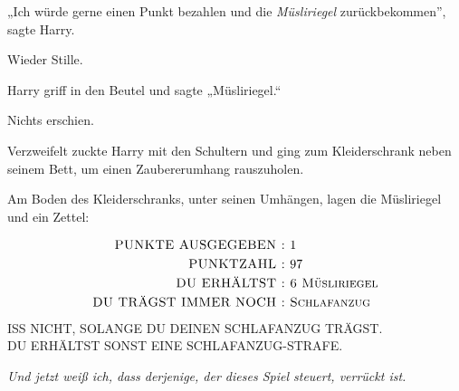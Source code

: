 „Ich würde gerne einen Punkt bezahlen und die \emph{Müsliriegel} zurückbekommen”, sagte Harry.

Wieder Stille.

Harry griff in den Beutel und sagte „Müsliriegel.“

Nichts erschien.

Verzweifelt zuckte Harry mit den Schultern und ging zum Kleiderschrank neben seinem Bett, um einen Zaubererumhang rauszuholen.

Am Boden des Kleiderschranks, unter seinen Umhängen, lagen die Müsliriegel und ein Zettel:
\begin{writtenNote}\centering
\begin{align*}
\hbox{\scshape \uppercase{Punkte ausgegeben}~: }&\hbox{1}\\
\hbox{\scshape \uppercase{Punktzahl}~: }&\hbox{97}\\
\hbox{\scshape \uppercase{Du erhältst}~: }&\hbox{\scshape 6 Müsliriegel}\\
\hbox{\scshape \uppercase{Du trägst immer noch}~: }&\hbox{\scshape Schlafanzug}\\
\end{align*}
\uppercase{Iss nicht, solange du deinen Schlafanzug trägst.}\\
\uppercase{Du erhältst sonst eine Schlafanzug-Strafe.}
\end{writtenNote}

\emph{Und jetzt weiß ich, dass derjenige, der dieses Spiel steuert, verrückt ist.}

